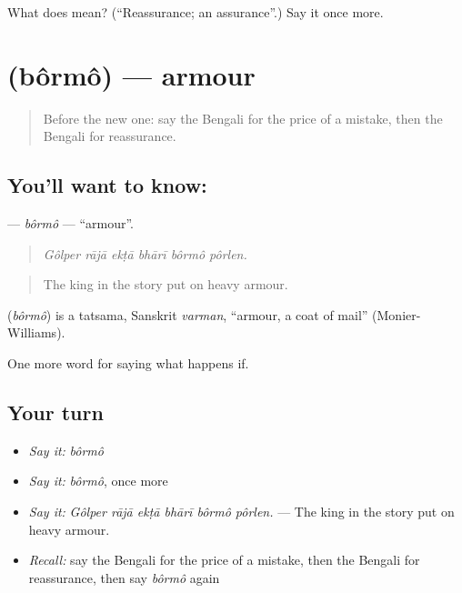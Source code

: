 \begin{tcolorbox}[breakable,colback=teal!4,colframe=teal!35!black,title={Before you move on}]
What does  mean? (\textquotedblleft{}Reassurance; an assurance\textquotedblright{}.) Say it once more.
\end{tcolorbox}
\section[\texorpdfstring{\bn{বর্ম} (bôrmô)}{বর্ম (bôrmô)}]{ (bôrmô) — armour}

\label{lesson:BN-C540-bormo}



\begin{quote}
Before the new one: say the Bengali for the price of a mistake, then the Bengali for reassurance.
\end{quote}

\subsection*{You'll want to know: }
\textbf{} — \emph{bôrmô} — \textquotedblleft{}armour\textquotedblright{}.

\begin{quote}
     
\end{quote}

\begin{quote}
\emph{Gôlper rājā ekṭā bhārī bôrmô pôrlen.}
\end{quote}

\begin{quote}
The king in the story put on heavy armour.
\end{quote}

\begin{cousinweb}
\textbf{} (\emph{bôrmô}) is a tatsama, Sanskrit \emph{varman}, \textquotedblleft{}armour, a coat of mail\textquotedblright{} (Monier-Williams).
\end{cousinweb}

\begin{grammarlens}[title={What you've built}]
One more word for saying what happens if.
\end{grammarlens}

\subsection*{Your turn}
\begin{itemize}
\raggedright
  \item \emph{Say it:} \emph{bôrmô}
  \item \emph{Say it:} \emph{bôrmô}, once more
  \item \emph{Say it:} \emph{Gôlper rājā ekṭā bhārī bôrmô pôrlen.} — The king in the story put on heavy armour.
  \item \emph{Recall:} say the Bengali for the price of a mistake, then the Bengali for reassurance, then say \emph{bôrmô} again
\end{itemize}

